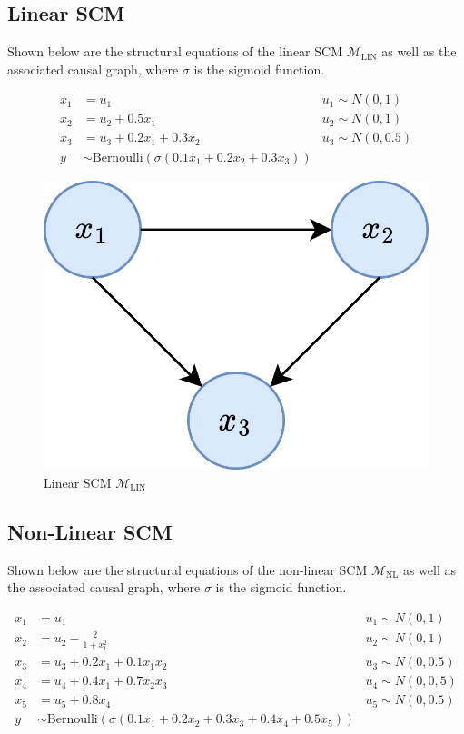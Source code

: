 \subsection{Linear SCM} \label{section:linear_scm}

Shown below are the structural equations of the linear SCM $\mathcal{M}_{\text{LIN}}$ as well as the associated causal graph, where $\sigma$ is the sigmoid function.

\begin{align} \label{eq:linear_scm_structural_equations}
	x_1 & = u_1 & u_1 \sim N(0,1) \\ \nonumber
	x_2 & = u_2 + 0.5x_1 & u_2 \sim N(0,1) \\ \nonumber
	x_3 & = u_3 + 0.2x_1 + 0.3x_2 & u_3 \sim N(0,0.5) \\ \nonumber
	y   & \sim \text{Bernoulli}(\sigma(0.1x_1 + 0.2x_2 + 0.3x_3))
\end{align}

\begin{figure}[!htb]
	\centering
	\includegraphics[width=0.4\linewidth]{images/draw.io/toy_scm.png}
	\caption{Linear SCM $\mathcal{M}_{\text{LIN}}$}
	\label{fig:simple_scm}
\end{figure}

\subsection{Non-Linear SCM}

Shown below are the structural equations of the non-linear SCM $\mathcal{M}_{\text{NL}}$ as well as the associated causal graph, where $\sigma$ is the sigmoid function.

\begin{align}
	x_1 & = u_1 & u_1 \sim N(0,1) \\ \nonumber
	x_2 & = u_2 - \frac{2}{1 + x_1^2} & u_2 \sim N(0,1) \\ \nonumber
	x_3 & = u_3 + 0.2x_1 + 0.1x_1x_2 & u_3 \sim N(0,0.5) \\ \nonumber
	x_4 & = u_4 + 0.4x_1 + 0.7x_2x_3 & u_4 \sim N(0,0,5) \\ \nonumber
	x_5 & = u_5 + 0.8x_4 & u_5 \sim N(0,0.5) \\ \nonumber
	y   & \sim \text{Bernoulli}(\sigma(0.1x_1 + 0.2x_2 + 0.3x_3 + 0.4x_4 + 0.5x_5))
\end{align}


